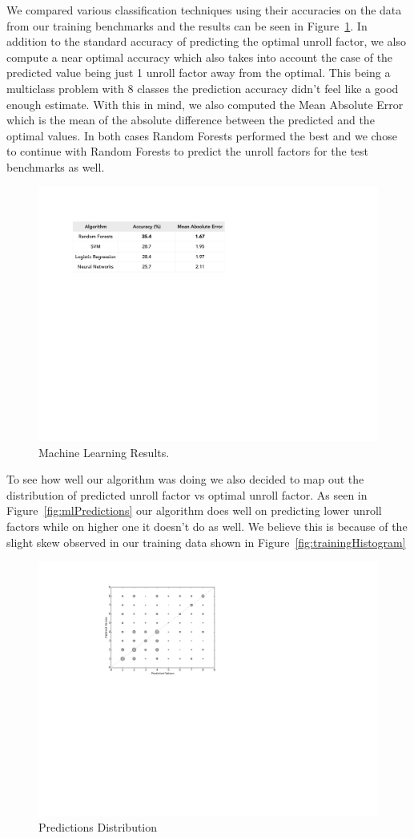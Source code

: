 \documentclass[]{sig-alternate}
\begin{document}
We compared various classification techniques using their accuracies on the data from our training benchmarks and the results can be seen in Figure~\ref{fig:mlResults}. In addition to the standard accuracy of predicting the optimal unroll factor, we also compute a near optimal accuracy which also takes into account the case of the predicted value being just 1 unroll factor away from the optimal. This being a multiclass problem with 8 classes the prediction accuracy didn't feel like a good enough estimate. With this in mind, we also computed the Mean Absolute Error which is the mean of the absolute difference between the predicted and the optimal values. In both cases Random Forests performed the best and we chose to continue with Random Forests to predict the unroll factors for the test benchmarks as well. 

\begin{figure}
  \includegraphics[width=0.\linewidth]{fig/mlResults.pdf}
  \caption{Machine Learning Results.}
  \label{fig:mlResults}
\end{figure}

To see how well our algorithm was doing we also decided to map out the distribution of predicted unroll factor vs optimal unroll factor. As seen in Figure~\ref{fig:mlPredictions} our algorithm does well on predicting lower unroll factors while on higher one it doesn't do as well. We believe this is because of the slight skew observed in our training data shown in Figure~\ref{fig:trainingHistogram}

\begin{figure}
  \center
  \includegraphics[width=0.90\linewidth]{fig/mlPredictions.pdf}
  \caption{Predictions Distribution}
  \label{fig:cfpResults}
\end{figure}
\end{document}
